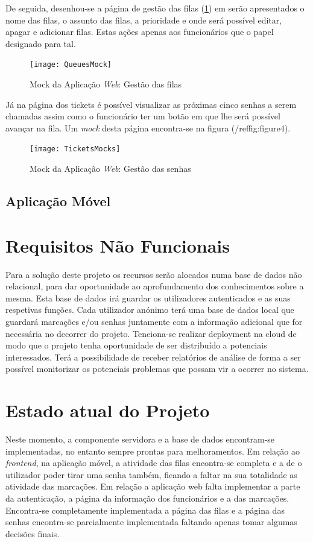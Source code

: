 \documentclass[12pt,a4paper]{article}
\begin{document}
De seguida, desenhou-se a página de gestão das filas (\ref{fig:figure3}) em serão apresentados o nome das filas, o assunto das filas, a prioridade e onde
será possível editar, apagar e adicionar filas. Estas ações apenas aos funcionários que o papel designado para tal.\par
\begin{figure}[h]
    \centering
    \texttt{[image: QueuesMock]}
    \caption{Mock da Aplicação \textit{Web}: Gestão das filas}
    \label{fig:figure3}
\end{figure}
Já na página dos tickets é possível visualizar as próximas cinco senhas a serem chamadas assim como o funcionário ter um botão em que lhe será possível avançar na
fila. Um \textit{mock} desta página encontra-se na figura (/ref{fig:figure4}).
\begin{figure}[h]
    \centering
    \texttt{[image: TicketsMocks]}
    \caption{Mock da Aplicação \textit{Web}: Gestão das senhas}
    \label{fig:figure4}
\end{figure}
\pagebreak
\subsection{Aplicação Móvel}
\pagebreak
\section{Requisitos Não Funcionais}
Para a solução deste projeto os recursos serão alocados numa base de dados não relacional, para dar
oportunidade ao aprofundamento dos conhecimentos sobre a mesma. Esta base de dados irá guardar os
utilizadores autenticados e as suas respetivas funções. Cada utilizador anónimo terá uma base de dados
local que guardará marcações e/ou senhas juntamente com a informação adicional que for necessária
no decorrer do projeto.
Tenciona-se realizar deployment na cloud de modo que o projeto tenha oportunidade de ser
distribuído a potenciais interessados. Terá a possibilidade de receber relatórios de análise de forma a
ser possível monitorizar os potenciais problemas que possam vir a ocorrer no sistema.
\pagebreak
\section{Estado atual do Projeto}
Neste momento, a componente servidora e a base de dados encontram-se implementadas, no entanto sempre prontas para melhoramentos. 
Em relação ao \textit{frontend}, na aplicação móvel, a atividade das filas encontra-se completa e a de o utilizador poder tirar uma senha 
também, ficando a faltar na sua totalidade as atividade das marcações. Em relação a aplicação web falta implementar a parte da autenticação,
a página da informação dos funcionários e a das marcações. Encontra-se completamente implementada a página das filas e a página das senhas 
encontra-se parcialmente implementada faltando apenas tomar algumas decisões finais.
\end{document}

